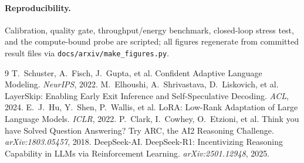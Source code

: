 \documentclass[11pt]{article}
\begin{document}
\paragraph{Reproducibility.} Calibration, quality gate, throughput/energy benchmark,
closed-loop stress test, and the compute-bound probe are scripted; all figures regenerate from
committed result files via \texttt{docs/arxiv/make\_figures.py}.

\begin{thebibliography}{9}
 T.~Schuster, A.~Fisch, J.~Gupta, et al. Confident Adaptive Language Modeling.
\emph{NeurIPS}, 2022.
 M.~Elhoushi, A.~Shrivastava, D.~Liskovich, et al. LayerSkip: Enabling Early
Exit Inference and Self-Speculative Decoding. \emph{ACL}, 2024.
 E.~J.~Hu, Y.~Shen, P.~Wallis, et al. LoRA: Low-Rank Adaptation of Large Language
Models. \emph{ICLR}, 2022.
 P.~Clark, I.~Cowhey, O.~Etzioni, et al. Think you have Solved Question Answering?
Try ARC, the AI2 Reasoning Challenge. \emph{arXiv:1803.05457}, 2018.
 DeepSeek-AI. DeepSeek-R1: Incentivizing Reasoning Capability in LLMs via
Reinforcement Learning. \emph{arXiv:2501.12948}, 2025.
\end{thebibliography}
\end{document}
